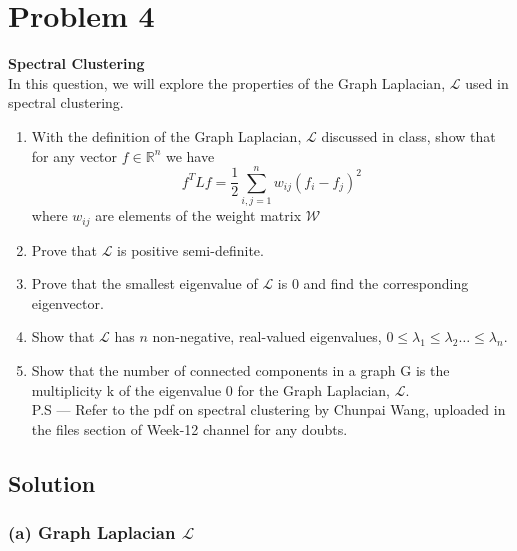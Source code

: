 \section*{Problem 4}

\textbf{Spectral Clustering}\\
In this question, we will explore the properties of the Graph Laplacian, \( \mathcal{L} \) used in spectral clustering.

\begin{enumerate}[label= (\alph*), noitemsep, topsep=0pt]
    \item With the definition of the Graph Laplacian, \( \mathcal{L} \) discussed in class, show that for any vector \( f \in \mathbb{R}^{n} \) we have
          \[
              f^{T} L f=\frac{1}{2} \sum_{i, j=1}^{n} w_{i j}\left(f_{i}-f_{j}\right)^{2}
          \]
          where \( w_{i j} \) are elements of the weight matrix \( \mathcal{W} \)

    \item Prove that \( \mathcal{L} \) is positive semi-definite.

    \item Prove that the smallest eigenvalue of \( \mathcal{L} \) is 0 and find the corresponding eigenvector.

    \item Show that \( \mathcal{L} \) has \( n \) non-negative, real-valued eigenvalues, \( 0 \leq \lambda_{1} \leq \lambda_{2} \ldots \leq \lambda_{n} \).

    \item Show that the number of connected components in a graph G is the multiplicity k of the eigenvalue 0 for the Graph Laplacian, \( \mathcal{L} \).\\
          P.S --- Refer to the pdf on spectral clustering by Chunpai Wang, uploaded in the files section of Week-12 channel for any doubts.
\end{enumerate}

\vspace*{-2em}
\subsection*{Solution}

\vspace*{-1em}
\subsubsection*{(a) Graph Laplacian \( \mathcal{L} \)}

